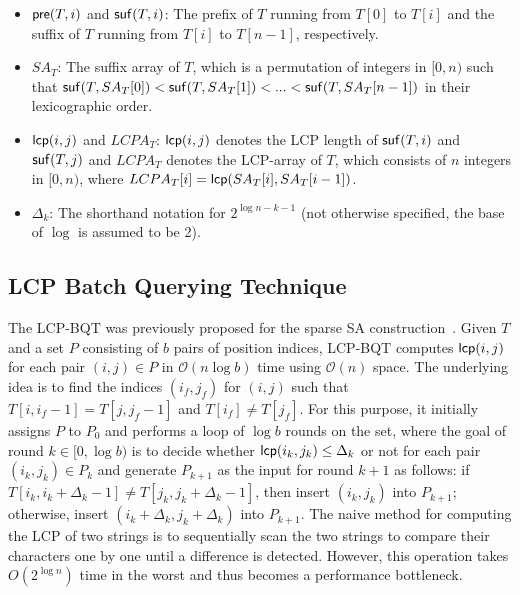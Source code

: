 \documentclass{llncs}
\begin{document}
\begin{itemize}
\item ${\sf pre}(T,i)$ and ${\sf suf}(T,i)$: The prefix of $T$ running from $T[0]$ to $T[i]$ and the suffix of $T$ running from $T[i]$ to $T[n-1]$, respectively.
\item $SA_T$: The suffix array of $T$, which is a permutation of integers in $[0,n)$ such that ${\sf suf}(T,SA_T[0])<{\sf suf}(T,SA_T[1])<...<{\sf suf}(T,SA_T[n-1])$ in their lexicographic order.
\item ${\sf lcp}(i,j)$ and $LCPA_T$: ${\sf lcp}(i,j)$ denotes the LCP length of ${\sf suf}(T,i)$ and ${\sf suf}(T,j)$ and $LCPA_T$ denotes the LCP-array of $T$, which consists of $n$ integers in $[0,n)$, where $LCPA_T[i]= {\sf lcp}(SA_T[i],SA_T[i-1])$.
\item $\Delta_{k}$: The shorthand notation for $2^{\log n - k - 1}$ (not otherwise specified, the base of $\log$ is assumed to be 2).
\end{itemize}

\subsection{LCP Batch Querying Technique}\label{subsec:lcp_batch_querying_technique}

The LCP-BQT was previously proposed for the sparse SA construction~\cite{Philip2013}.
Given $T$ and a set $P$ consisting of $b$ pairs of position indices, LCP-BQT computes ${\sf lcp}(i,j)$ for each pair $(i,j)\in P$ in $\mathcal{O}(n\log b)$ time using $\mathcal{O}(n)$ space. The underlying idea is to find the indices $(i_{f}, j_{f})$ for $(i,j)$ such that $T[i,i_{f}-1]=T[j,j_{f}-1]$ and $T[i_{f}] \neq T[j_{f}]$. For this purpose, it initially assigns $P$ to $P_0$ and performs a loop of $\log b$ rounds on the set, where the goal of round $k\in [0,\log b)$ is to decide whether ${\sf lcp}(i_k,j_k) \le \Delta_k$ or not for each pair $(i_k,j_k)\in P_k$ and generate $P_{k+1}$ as the input for round $k+1$ as follows: if $T[i_k,i_k+\Delta_k-1] \neq T[j_k,j_k+\Delta_k-1]$, then insert $(i_k,j_k)$ into $P_{k+1}$; otherwise, insert $(i_k+\Delta_k,j_k+\Delta_k)$ into $P_{k+1}$. The naive method for computing the LCP of two strings is to sequentially scan the two strings to compare their characters one by one until a difference is detected. However, this operation takes $O(2^{\log n})$ time in the worst and thus becomes a performance bottleneck.
\end{document}
